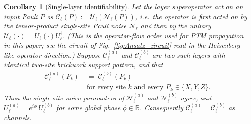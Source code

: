 \documentclass[%
 reprint,
superscriptaddress,
 amsmath,amssymb,
 aps,
]{revtex4-2}
\newtheorem{corollary}{Corollary}[theorem]
\begin{document}
\begin{corollary}[Single-layer identifiability]
\label{cor:single_layer_identifiability}
Let the layer superoperator act on an input Pauli $P$ as $\mathcal{C}_\ell(P) := \mathcal{U}_\ell(\mathcal{N}_\ell(P))$, i.e.\ the operator is first acted on by the tensor-product single-site Pauli noise $\mathcal{N}_\ell$ and then by the unitary $\mathcal{U}_\ell(\cdot) = U_\ell(\cdot)U_\ell^{\dagger}$. (This is the operator-flow order used for PTM propagation in this paper; see the circuit of Fig.~\ref{fig:Ansatz_circuit} read in the Heisenberg-like operator direction.) Suppose $\mathcal{C}_\ell^{(a)}$ and $\mathcal{C}_\ell^{(b)}$ are two such layers with identical two-site brickwork support pattern, and that
\begin{equation}
    \begin{split}
        \mathcal{C}_\ell^{(a)}(P_k) \;&=\; \mathcal{C}_\ell^{(b)}(P_k)\\
        &\text{for every site }k\text{ and every }P_k\in\{X,Y,Z\}.
    \end{split}
\end{equation}
Then the single-site noise parameters of $\mathcal{N}_\ell^{(a)}$ and $\mathcal{N}_\ell^{(b)}$ agree, and $U_\ell^{(a)} = e^{i\phi}\,U_\ell^{(b)}$ for some global phase $\phi\in\mathbb{R}$. Consequently $\mathcal{C}_\ell^{(a)}=\mathcal{C}_\ell^{(b)}$ as channels.
\end{corollary}
\end{document}
